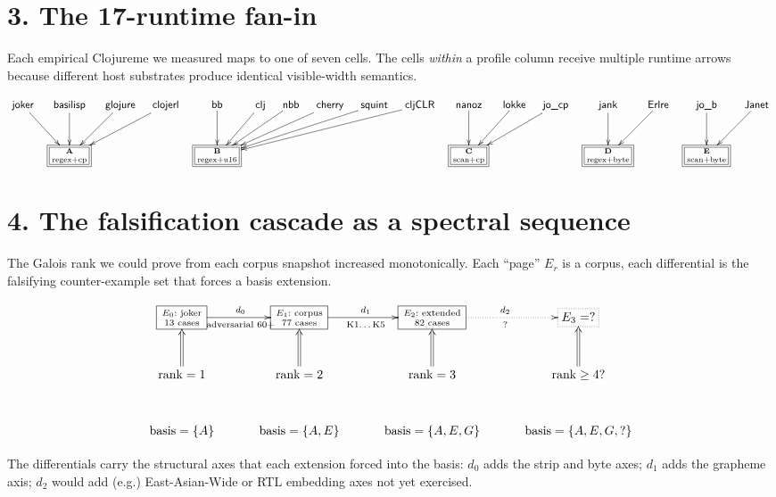 \documentclass[11pt]{article}
\begin{document}
\newpage
\section*{3. The 17-runtime fan-in}

Each empirical Clojureme we measured maps to one of seven cells.
The cells \emph{within} a profile column receive multiple runtime arrows
because different host substrates produce identical visible-width semantics.

\[
\xymatrix@C=1em@R=3em{
\textsf{joker}\ar[dr]
& \textsf{basilisp}\ar[d]
& \textsf{glojure}\ar[dl]
& \textsf{clojerl}\ar[dll]
& \textsf{bb}\ar[d]
& \textsf{clj}\ar[dl]
& \textsf{nbb}\ar[dll]
& \textsf{cherry}\ar[dlll]
& \textsf{squint}\ar[dllll]
& \textsf{cljCLR}\ar[dlllll]
& \textsf{nanoz}\ar[d]
& \textsf{lokke}\ar[dl]
& \textsf{jo\_cp}\ar[dll]
& \textsf{jank}\ar[d]
& \textsf{Erlre}\ar[dl]
& \textsf{jo\_b}\ar[d]
& \textsf{Janet}\ar[dl] \\
& *+[F=]{\textbf{A}\atop\text{regex+cp}}
& & &
*+[F=]{\textbf{B}\atop\text{regex+u16}}
& & & & & &
*+[F=]{\textbf{C}\atop\text{scan+cp}}
& & &
*+[F=]{\textbf{D}\atop\text{regex+byte}}
& &
*+[F=]{\textbf{E}\atop\text{scan+byte}}
&
}
\]

\section*{4. The falsification cascade as a spectral sequence}

The Galois rank we could prove from each corpus snapshot increased monotonically.
Each ``page'' $E_r$ is a corpus, each differential is the falsifying
counter-example set that forces a basis extension.

\[
\xymatrix@C=3em@R=3em{
*+[F]{E_0:\text{ joker}\atop\text{13 cases}}
   \ar[r]^{d_0}_{\text{adversarial 60+}}
& *+[F]{E_1:\text{ corpus}\atop\text{77 cases}}
   \ar[r]^{d_1}_{\text{K1\ldots K5}}
& *+[F]{E_2:\text{ extended}\atop\text{82 cases}}
   \ar@{.>}[r]^{d_2}_{?}
& *+[F.]{E_3 = ?} \\
\text{rank} = 1
   \ar@{=>}[u]
& \text{rank} = 2
   \ar@{=>}[u]
& \text{rank} = 3
   \ar@{=>}[u]
& \text{rank} \geq 4 ?
   \ar@{=>}[u] \\
\text{basis} = \{A\}
& \text{basis} = \{A,E\}
& \text{basis} = \{A,E,G\}
& \text{basis} = \{A,E,G,?\}
}
\]

The differentials carry the structural axes that each extension forced
into the basis: $d_0$ adds the strip and byte axes; $d_1$ adds the
grapheme axis; $d_2$ would add (e.g.) East-Asian-Wide or RTL embedding axes
not yet exercised.
\end{document}
